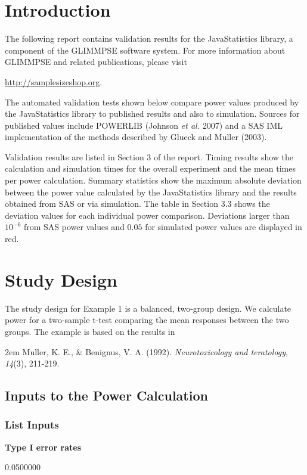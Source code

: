 \documentclass{glimmpse-report}
\begin{document}
\section{Introduction}
The following report contains validation results for the JavaStatistics library, a component of the GLIMMPSE software system.  For more information about GLIMMPSE and related publications, please visit

 

\href{http://samplesizeshop.org}{http://samplesizeshop.org}.

The automated validation tests shown below compare power values produced by the JavaStatistics library to published results and also to simulation.  Sources for published values include POWERLIB (Johnson \emph{et al.} 2007) and a SAS IML implementation of the methods described by Glueck and Muller (2003).

Validation results are listed in Section 3 of the report.  Timing results show the calculation and simulation times for the overall experiment and the mean times per power calculation.  Summary statistics show the maximum absolute deviation between the power value calculated by the JavaStatistics library and the results obtained from SAS or via simulation.  The table in Section 3.3 shows the deviation values for each individual power comparison.  Deviations larger than $10^{-6}$ from SAS power values and $0.05$ for simulated power values are displayed in red.

 \section{Study Design}
The study design for Example 1 is a balanced, two-group design.  We calculate power for a two-sample t-test comparing the mean responses between the two groups.  The example is based on the results in 

\hangindent2em
Muller, K. E., \& Benignus, V. A. (1992). \emph{Neurotoxicology and teratology}, \emph{14}(3), 211-219.
\subsection{Inputs to the Power Calculation}
\subsubsection{List Inputs}

{\bf Type I error rates}

0.0500000
\end{document}
